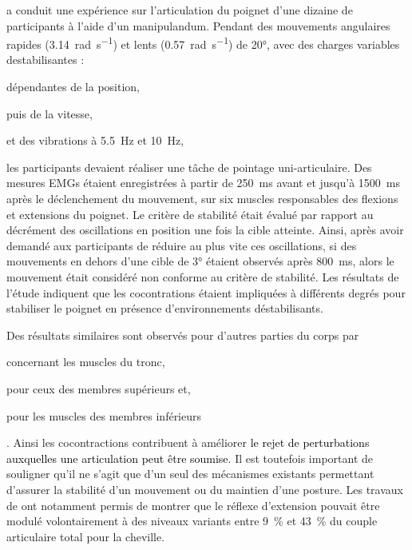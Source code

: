 \textcite{milner_adaptation_2002} a conduit une expérience sur l'articulation du poignet d'une dizaine de participants à l'aide d'un manipulandum. Pendant des mouvements angulaires rapides (\SI{3.14}{\radian\per\second}) et lents (\SI{0.57}{\radian\per\second}) de \ang{20}, avec des charges variables destabilisantes :  
\begin{enumerate*}[label=\roman*)]
	\item dépendantes de la position, %
	\item puis de la vitesse, %
	\item et des vibrations à \SI{5.5}{\hertz} et \SI{10}{\hertz}, 
\end{enumerate*}
les participants devaient réaliser une tâche de pointage uni-articulaire. Des mesures EMGs étaient enregistrées à partir de \SI{250}{\milli\second} avant et jusqu'à \SI{1500}{\milli\second} après le déclenchement du mouvement, sur six muscles responsables des flexions et extensions du poignet. Le critère de stabilité était évalué par rapport au décrément des oscillations en position une fois la cible atteinte. Ainsi, après avoir demandé aux participants de réduire au plus vite ces oscillations, si des mouvements en dehors d'une cible de \ang{3} étaient observés après \SI{800}{\milli\second}, alors le mouvement était considéré non conforme au critère de stabilité. Les résultats de l'étude indiquent que les cocontrations étaient impliquées à différents degrés pour stabiliser le poignet en présence d'environnements déstabilisants.

Des résultats similaires sont observés pour d'autres parties du corps par %
\begin{enumerate*}[label=\roman*)]
	\item \textcite{cholewicki_stabilizing_1997, granata_costbenefit_2000} concernant les muscles du tronc,
	\item \textcite{hogan_adaptive_1984, de_serres_wrist_1991, burdet_central_2001} pour ceux des membres supérieurs et,
	\item \textcite{hirokawa_muscular_1991, finley_contributions_2012, di_nardo_assessment_2015, kim_center_2018} pour les muscles des membres inférieurs
\end{enumerate*}. %
Ainsi les cocontractions contribuent à améliorer \textcolor{black}{le rejet de perturbations auxquelles une articulation peut être soumise}. Il est toutefois important de souligner qu'il ne s'agit que d'un seul des mécanismes existants permettant d'assurer la stabilité d'un mouvement ou du maintien d'une posture. Les travaux de \textcite{ludvig_voluntary_2007} ont notamment permis de montrer que le réflexe d'extension pouvait être modulé volontairement à des niveaux variants entre \SI{9}{\percent} et \SI{43}{\percent} du couple articulaire total pour la cheville.

